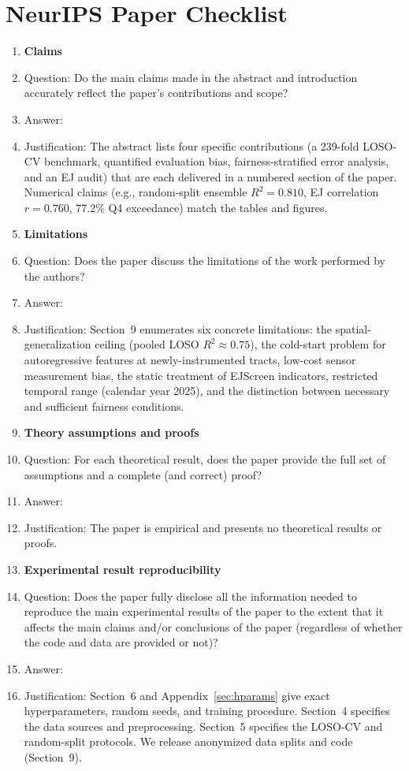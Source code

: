 \section*{NeurIPS Paper Checklist}

\begin{enumerate}

\item {\bf Claims}
    \item[] Question: Do the main claims made in the abstract and introduction accurately reflect the paper's contributions and scope?
    \item[] Answer: \answerYes{}
    \item[] Justification: The abstract lists four specific contributions (a 239-fold LOSO-CV benchmark, quantified evaluation bias, fairness-stratified error analysis, and an EJ audit) that are each delivered in a numbered section of the paper. Numerical claims (e.g., random-split ensemble $R^2=0.810$, EJ correlation $r=0.760$, 77.2\% Q4 exceedance) match the tables and figures.

\item {\bf Limitations}
    \item[] Question: Does the paper discuss the limitations of the work performed by the authors?
    \item[] Answer: \answerYes{}
    \item[] Justification: Section~9 enumerates six concrete limitations: the spatial-generalization ceiling (pooled LOSO $R^2\approx 0.75$), the cold-start problem for autoregressive features at newly-instrumented tracts, low-cost sensor measurement bias, the static treatment of EJScreen indicators, restricted temporal range (calendar year 2025), and the distinction between necessary and sufficient fairness conditions.

\item {\bf Theory assumptions and proofs}
    \item[] Question: For each theoretical result, does the paper provide the full set of assumptions and a complete (and correct) proof?
    \item[] Answer: \answerNA{}
    \item[] Justification: The paper is empirical and presents no theoretical results or proofs.

\item {\bf Experimental result reproducibility}
    \item[] Question: Does the paper fully disclose all the information needed to reproduce the main experimental results of the paper to the extent that it affects the main claims and/or conclusions of the paper (regardless of whether the code and data are provided or not)?
    \item[] Answer: \answerYes{}
    \item[] Justification: Section~6 and Appendix~\ref{sec:hparams} give exact hyperparameters, random seeds, and training procedure. Section~4 specifies the data sources and preprocessing. Section~5 specifies the LOSO-CV and random-split protocols. We release anonymized data splits and code (Section~9).


\end{enumerate}
